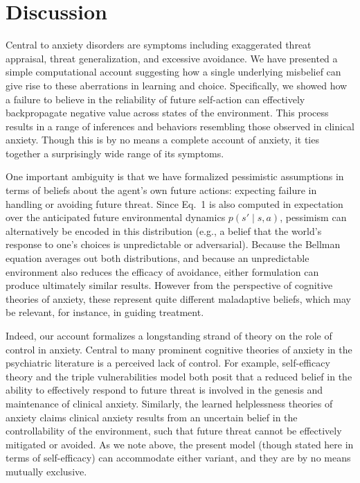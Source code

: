 \documentclass[11pt]{article} %
\begin{document}
\section{Discussion}

Central to anxiety disorders are symptoms including exaggerated threat appraisal, threat generalization, and excessive avoidance. We have presented a simple computational account suggesting how a single underlying misbelief can give rise to these aberrations in learning and choice. Specifically, we showed how a failure to believe in the reliability of future self-action can effectively backpropagate negative value across states of the environment. This process results in a range of inferences and behaviors resembling those observed in clinical anxiety. Though this is by no means a complete account of anxiety, it ties together a surprisingly wide range of its symptoms.

One important ambiguity is that we have formalized pessimistic assumptions in terms of beliefs about the agent's own future actions: expecting failure in handling or avoiding future threat. Since Eq.~1 is also computed in expectation over the anticipated future environmental dynamics $p(s' \mid s,a)$, pessimism can alternatively be encoded in this distribution (e.g., a belief that the world's response to one's choices is unpredictable or adversarial). Because the Bellman equation averages out both distributions, and because an unpredictable environment also reduces the efficacy of avoidance, either formulation can produce ultimately similar results. However from the perspective of cognitive theories of anxiety, these represent quite different maladaptive beliefs, which may be relevant, for instance, in guiding treatment.

Indeed, our account formalizes a longstanding strand of theory on the role of control in anxiety. Central to many prominent cognitive theories of anxiety in the psychiatric literature is a perceived lack of control. For example, self-efficacy theory\citep{bandura1977} and the triple vulnerabilities model\citep{barlow2002} both posit that a reduced belief in the ability to effectively respond to future threat is involved in the genesis and maintenance of clinical anxiety. Similarly, the learned helplessness theories of anxiety\cite{alloy1990} claims clinical anxiety results from an uncertain belief in the controllability of the environment, such that future threat cannot be effectively mitigated or avoided. As we note above, the present model (though stated here in terms of self-efficacy) can accommodate either variant, and they are by no means mutually exclusive.
\end{document}
